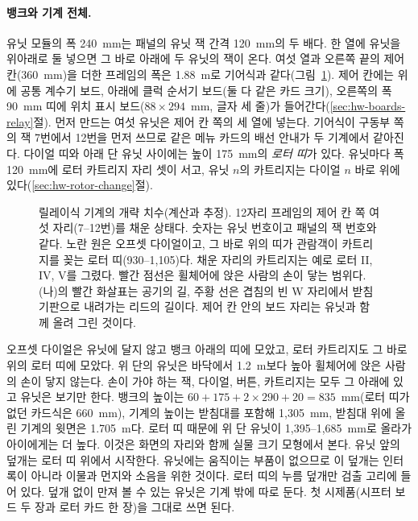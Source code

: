 \paragraph{뱅크와 기계 전체.} 유닛 모듈의 폭 240~mm는 패널의 유닛 잭 간격 120~mm의 두 배다. 한 열에 유닛을
위아래로 둘 넣으면 그 바로 아래에 두 유닛의 잭이 온다. 여섯 열과 오른쪽 끝의 제어 칸(360~mm)을 더한 프레임의
폭은 1.88~m로 기어식과 같다(그림~\ref{fig:hw-relay-dim-machine}). 제어 칸에는 위에 공통 계수기 보드, 아래에 클럭
순서기 보드(둘 다 같은 카드 크기), 오른쪽의 폭 90~mm 띠에 위치 표시 보드($88 \times 294$~mm, 글자 세 줄)가
들어간다(\ref{sec:hw-boards-relay}절). 먼저 만드는 여섯 유닛은 제어 칸 쪽의 세 열에 넣는다. 기어식이 구동부 쪽의 잭 7번에서 12번을 먼저 쓰므로
같은 메뉴 카드의 배선 안내가 두 기계에서 같아진다. 다이얼 띠와 아래 단 유닛 사이에는 높이 175~mm의 \emph{로터
띠}가 있다. 유닛마다 폭 120~mm에 로터 카트리지 자리 셋이 서고, 유닛 $n$의 카트리지는 다이얼 $n$ 바로 위에
있다(\ref{sec:hw-rotor-change}절).

\begin{figure}[ht]
\centering

\caption{릴레이식 기계의 개략 치수(계산과 추정). 12자리 프레임의 제어 칸 쪽 여섯 자리(7--12번)를 채운 상태다.
숫자는 유닛 번호이고 패널의 잭 번호와 같다. 노란 원은 오프셋 다이얼이고, 그 바로 위의 띠가 관람객이 카트리지를
꽂는 로터 띠(930--1,105)다. 채운 자리의 카트리지는 예로 로터 II, IV, V를 그렸다. 빨간 점선은 휠체어에 앉은 사람의 손이
닿는 범위다. (나)의 빨간 화살표는 공기의 길, 주황 선은 겹침의 빈 W 자리에서 받침 기판으로 내려가는 리드의 길이다.
제어 칸 안의 보드 자리는 유닛과 함께 올려 그린 것이다.}
\label{fig:hw-relay-dim-machine}
\end{figure}

오프셋 다이얼은 유닛에 달지 않고 뱅크 아래의 띠에 모았고, 로터 카트리지도 그 바로 위의 로터 띠에 모았다. 위 단의
유닛은 바닥에서 1.2~m보다 높아 휠체어에 앉은 사람의 손이 닿지 않는다. 손이 가야 하는 잭, 다이얼, 버튼, 카트리지는
모두 그 아래에 있고 유닛은 보기만 한다. 뱅크의 높이는 $60 + 175 + 2 \times 290 + 20 = 835$~mm(로터 띠가 없던 카드식은
660~mm), 기계의 높이는 받침대를 포함해 1,305~mm, 받침대 위에 올린 기계의 윗면은 1.705~m다. 로터 띠 때문에 위 단
유닛이 1,395--1,685~mm로 올라가 아이에게는 더 높다. 이것은 화면의 자리와 함께 실물 크기 모형에서 본다. 유닛 앞의
덮개는 로터 띠 위에서 시작한다. 유닛에는 움직이는 부품이 없으므로 이 덮개는 인터록이 아니라 이물과 먼지와 소음을
위한 것이다. 로터 띠의 누름 덮개만 검출 고리에 들어 있다. 덮개 없이 만져 볼 수 있는 유닛은 기계 밖에 따로 둔다. 첫 시제품(시프터 보드 두 장과
로터 카드 한 장)을 그대로 쓰면 된다.


